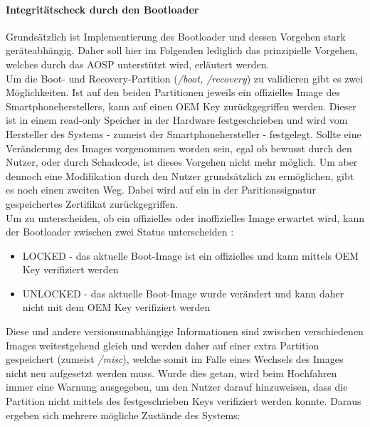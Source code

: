 	\paragraph{Integritätscheck durch den Bootloader}
	Grundsätzlich ist Implementierung des Bootloader und dessen Vorgehen stark
	geräteabhängig. Daher soll hier im Folgenden lediglich das prinzipielle
	Vorgehen, welches durch das AOSP unterstützt wird, erläutert werden.\\
	Um die Boot- und Recovery-Partition (\textit{/boot, /recovery}) zu validieren
	gibt es zwei Möglichkeiten. Ist auf den beiden Partitionen jeweils ein 
	offizielles Image des Smartphoneherstellers, kann auf einen OEM Key
	zurückgegriffen werden. Dieser ist in einem read-only Speicher in der Hardware
	festgeschrieben und wird vom Hersteller des Systems - zumeist der
	Smartphonehersteller - festgelegt. Sollte eine Veränderung des Images
	vorgenommen worden sein, egal ob bewusst durch den Nutzer, oder durch
	Schadcode, ist dieses Vorgehen nicht mehr möglich. Um aber dennoch eine
	Modifikation durch den Nutzer grundsätzlich zu ermöglichen, gibt es noch einen
	zweiten Weg. Dabei wird auf ein in der Paritionssignatur gespeichertes
	Zertifikat zurückgegriffen.\\
	Um zu unterscheiden, ob ein offizielles oder inoffizielles Image erwartet
	wird, kann der Bootloader zwischen zwei Status
	unterscheiden \cite{VerifiedBoot}:
	\begin{itemize}\itemsep0pt
		\item LOCKED - das aktuelle Boot-Image ist ein offizielles und kann mittels OEM Key verifiziert werden
		\item UNLOCKED - das aktuelle Boot-Image wurde verändert und kann daher nicht mit dem OEM Key verifiziert werden
	\end{itemize}
	Diese und andere versionsunabhängige Informationen sind zwischen
	verschiedenen Images weitestgehend gleich und werden daher auf einer extra
	Partition gespeichert (zumeist \textit{/misc}), welche somit im Falle eines
	Wechsels des Images nicht neu aufgesetzt werden muss.
	Wurde dies getan, wird beim Hochfahren immer eine Warnung ausgegeben, um den
	Nutzer darauf hinzuweisen, dass die Partition nicht mittels des
	festgeschrieben Keys verifiziert werden konnte. Daraus ergeben sich mehrere
	mögliche Zustände des Systems:
	
